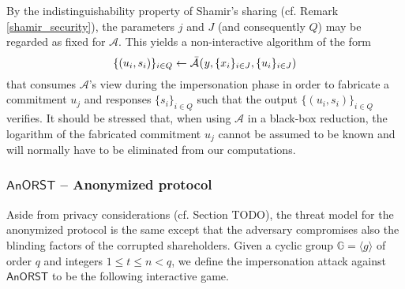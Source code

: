 \documentclass[psamsfonts, reqno]{amsart}
\theoremstyle{definition}
\theoremstyle{remark}
\numberwithin{equation}{section}
\begin{document}
By the indistinguishability property of
Shamir's sharing (cf. Remark \ref{shamir_security}),
the parameters $j$ and $J$ (and consequently $Q$)
may be regarded as fixed for $\mathcal{A}$.
This yields a non-interactive algorithm of the form
\vspace{5pt}
\begin{equation}\label{adversary_internal}
\{(u_i, s_i)\}_{i \in Q} \leftarrow
\mathcal{\bar{A}}\hspace{0.5pt}
	(
		\hspace{0.5pt}
		y,
		\{x_i\}_{i \in J},
		\{u_i\}_{i \in J}
	)
\vspace{5pt}
\end{equation}
that consumes $\mathcal{A}$'s view
during the impersonation phase
in order to fabricate a commitment $u_j$ and responses
$\{s_i\}_{i \in Q}$ such that the output
$\{(u_i, s_i)\}_{i \in Q}$ verifies.
It should be stressed that, when using $\mathcal{A}$
in a black-box reduction,
the logarithm of the fabricated commitment $u_j$
cannot be assumed to be known
and will normally have to be eliminated from our computations.

\subsubsection{$\mathsf{AnORST}$ -- Anonymized protocol}\label{section_anorst_security_imp}

\noindent
Aside from privacy considerations (cf. Section TODO),
the threat model for the anonymized protocol is the same
except that the adversary compromises also
the blinding factors of the corrupted shareholders.
Given a cyclic group $\mathbb{G} = \langle g \rangle$ of order $q$
and integers $1 \le t \le n < q$, we define
the impersonation attack against $\textsf{AnORST}$
to be the following interactive game.
\end{document}
